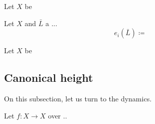 \begin{theorem}[label=\labelNFM{thm:arithmetic-siu-inequality}, status=draft, tag=0000000]
	Let $X$ be
	\Yang{}
\end{theorem}


\begin{definition}[label=\labelNFM{def:successive-minima}, status=draft, tag=0000000]
	Let $X$ and $\bar{L}$ a ...
	\[ e_i(\bar L) \coloneqq \]
	\Yang{}
\end{definition}

\begin{theorem}[label=\labelNFM{thm:fundamental-inequality-IV}, status=draft, tag=0000000]
	Let $X$ be

	\Yang{}
\end{theorem}

































\subsection[status=draft,tag=0000000,label=\labelNFM{subsec:canonical-height}]{Canonical height}

\Yang{}

On this subsection, let us turn to the dynamics.

Let $f: X \to X$ over ..

